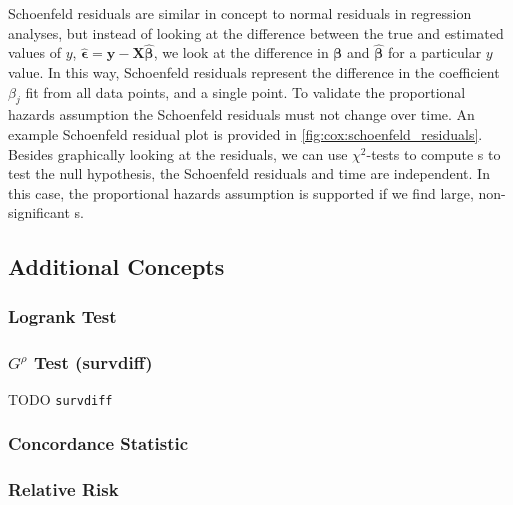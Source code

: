 Schoenfeld residuals are similar in concept to normal residuals in regression analyses,
but instead of looking at the difference between the true and estimated values of $y$,
$\hat{\bm{\epsilon}} = \mathbf{y} - \mathbf{X} \hat{\bm{\beta}}$,
we look at the difference in $\bm{\beta}$ and $\hat{\bm{\beta}}$ for a particular $y$ value.
In this way, Schoenfeld residuals represent the difference in the
coefficient $\beta_{j}$ fit from all data points, and a single point.
To validate the proportional hazards assumption
the Schoenfeld residuals \cite{schoenfeld} must not change over time.
An example Schoenfeld residual plot is provided in
\cref{fig:cox:schoenfeld_residuals}.
Besides graphically looking at the residuals,
we can use $\chi^{2}$-tests to compute {\pvalue}s
to test the null hypothesis, \ie the Schoenfeld residuals and time are independent.
In this case, the proportional hazards assumption is supported
if we find large, non-significant {\pvalue}s.

\subsection{Additional Concepts}
\label{additional:Survival:additional}

\subsubsection{Logrank Test}
\label{additional:Survival:additional:logrank}

\subsubsection{$G^{\rho}$ Test (survdiff)}
\label{additional:Survival:additional:survdiff}
TODO \texttt{survdiff}

\subsubsection{Concordance Statistic}
\label{additional:Survival:additional:concordance}

\subsubsection{Relative Risk}
\label{additional:Survival:additional:RR}

